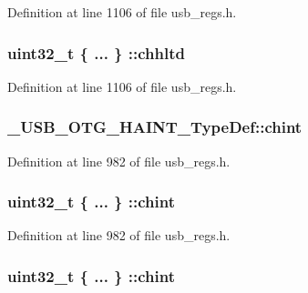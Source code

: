 Definition at line 1106 of file usb\-\_\-regs.\-h.

\hypertarget{group___u_s_b___o_t_g___d_r_i_v_e_r_gaca9557d160053a1b3b933a885b45365e}{
\subsubsection[{chhltd}]{\setlength{\rightskip}{0pt plus 5cm}uint32\-\_\-t \{ ... \} \-::chhltd}}\label{group___u_s_b___o_t_g___d_r_i_v_e_r_gaca9557d160053a1b3b933a885b45365e}


Definition at line 1106 of file usb\-\_\-regs.\-h.

\hypertarget{group___u_s_b___o_t_g___d_r_i_v_e_r_gaa5b226912e64d070153feb7a20f3ffa5}{
\subsubsection[{chint}]{ \-\_\-\-U\-S\-B\-\_\-\-O\-T\-G\-\_\-\-H\-A\-I\-N\-T\-\_\-\-Type\-Def\-::chint}}\label{group___u_s_b___o_t_g___d_r_i_v_e_r_gaa5b226912e64d070153feb7a20f3ffa5}


Definition at line 982 of file usb\-\_\-regs.\-h.

\hypertarget{group___u_s_b___o_t_g___d_r_i_v_e_r_ga35fd613477c1724009189a0c9c308421}{
\subsubsection[{chint}]{\setlength{\rightskip}{0pt plus 5cm}uint32\-\_\-t \{ ... \} \-::chint}}\label{group___u_s_b___o_t_g___d_r_i_v_e_r_ga35fd613477c1724009189a0c9c308421}


Definition at line 982 of file usb\-\_\-regs.\-h.

\hypertarget{group___u_s_b___o_t_g___d_r_i_v_e_r_ga8616e8ca00fc830908f64d8f230bcc91}{
\subsubsection[{chint}]{\setlength{\rightskip}{0pt plus 5cm}uint32\-\_\-t \{ ... \} \-::chint}}\label{group___u_s_b___o_t_g___d_r_i_v_e_r_ga8616e8ca00fc830908f64d8f230bcc91}


